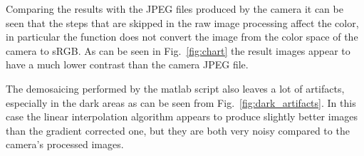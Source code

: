\documentclass[a4paper,oneside]{article}
\begin{document}
Comparing the results with the JPEG files produced by the camera it
can be seen that the steps that are skipped in the raw image processing
affect the color, in particular the  function
does not convert the image from the color space of the camera to
sRGB. As can be seen in Fig.~\ref{fig:chart} the result images appear
to have a much lower contrast than the camera JPEG file.

The demosaicing performed by the matlab script also leaves a lot of
artifacts, especially in the dark areas as can be seen from
Fig.~\ref{fig:dark_artifacts}. In this case the linear interpolation
algorithm appears to produce slightly better images than the gradient
corrected one, but they are both very noisy compared to the camera's
processed images.

\printbibliography
\end{document}
